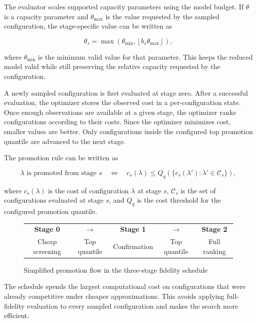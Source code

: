 \documentclass[12pt,a4paper]{report}
\begin{document}
\noindent The evaluator scales supported capacity parameters using the model budget. If
\(\theta\) is a capacity parameter and \(\theta_{\max}\) is the value requested
by the sampled configuration, the stage-specific value can be written as

\[
\theta_s =
\max
\left(
\theta_{\min},
\left\lfloor b_s \theta_{\max} \right\rfloor
\right),
\]

\noindent where \(\theta_{\min}\) is the minimum valid value for that parameter. This keeps
the reduced model valid while still preserving the relative capacity requested
by the configuration.

\noindent A newly sampled configuration is first evaluated at stage zero. After a
successful evaluation, the optimizer stores the observed cost in a
per-configuration state. Once enough observations are available at a given
stage, the optimizer ranks configurations according to their costs. Since the
optimizer minimizes cost, smaller values are better. Only configurations inside
the configured top promotion quantile are advanced to the next stage.

\noindent The promotion rule can be written as

\[
\lambda \text{ is promoted from stage } s
\quad \Longleftrightarrow \quad
c_s(\lambda) \leq Q_q
\left(
\{c_s(\lambda') : \lambda' \in \mathcal{C}_s\}
\right),
\]

\noindent where \(c_s(\lambda)\) is the cost of configuration \(\lambda\) at stage \(s\),
\(\mathcal{C}_s\) is the set of configurations evaluated at stage \(s\), and
\(Q_q\) is the cost threshold for the configured promotion quantile.

\begin{figure}[H]
\centering
\renewcommand{\arraystretch}{1.25}
\begin{tabular}{c c c c c}
\textbf{Stage 0} &
\(\longrightarrow\) &
\textbf{Stage 1} &
\(\longrightarrow\) &
\textbf{Stage 2} \\
Cheap screening &
Top quantile &
Confirmation &
Top quantile &
Full ranking \\
\end{tabular}
\caption{Simplified promotion flow in the three-stage fidelity schedule}
\label{fig:gp-automl-fidelity-promotion-flow}
\end{figure}

\noindent The schedule spends the largest computational cost on configurations that were
already competitive under cheaper approximations. This avoids applying
full-fidelity evaluation to every sampled configuration and makes the search
more efficient.
\end{document}
